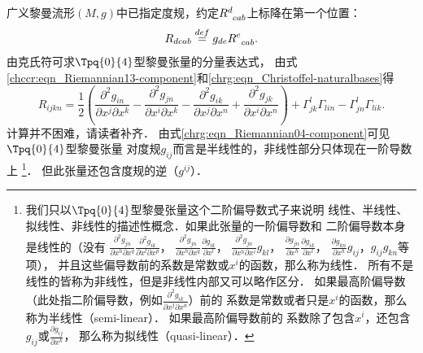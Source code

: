 广义黎曼流形$(M,g)$中已指定度规，约定$R_{\hphantom{a} cab}^d$上标降在第一个位置：
\begin{equation}\label{chrg:eqn_RiemannianCurvature-d4}
    R_{dcab} \overset{def}{=} g_{de}R_{\hphantom{a} cab}^e.
\end{equation}
由克氏符可求$\Tpq{0}{4}$型黎曼张量的分量表达式，
由式\eqref{chccr:eqn_Riemannian13-component}和\eqref{chrg:eqn_Christoffel-naturalbases}得
\begin{equation}\label{chrg:eqn_Riemannian04-component}
    R_{ijkn} =\frac{1}{2}\left(
           \frac{\partial^2 g_{in}} {\partial x^j\partial x^k}
         - \frac{\partial^2 g_{jn}} {\partial x^i\partial x^k}
         - \frac{\partial^2 g_{ik}} {\partial x^j\partial x^n}
         + \frac{\partial^2 g_{jk}} {\partial x^i\partial x^n} \right)
         + \Gamma_{jk}^l\Gamma _{lin} - \Gamma _{jn}^l\Gamma _{lik} .
\end{equation}  %
计算并不困难，请读者补齐．
由式\eqref{chrg:eqn_Riemannian04-component}可见$\Tpq{0}{4}$型黎曼张量
对度规$g_{ij}$而言是半线性的，非线性部分只体现在一阶导数上
{\footnote{我们只以$\Tpq{0}{4}$型黎曼张量这个二阶偏导数式子来说明
线性、半线性、拟线性、非线性的描述性概念．如果此张量的一阶偏导数和
二阶偏导数本身是线性的（没有
$\frac{\partial^2 g_{jn}} {\partial  x^h\partial  x^q}\frac{\partial^2 g_{ik}} {\partial  x^l\partial  x^p}$，
$\frac{\partial^2 g_{jn}} {\partial  x^h\partial  x^q}\frac{\partial g_{ik}} {\partial  x^l}$，
$\frac{\partial^2 g_{jn}} {\partial  x^h\partial  x^i}g_{kl}$，
$\frac{\partial g_{jn}} {\partial  x^h}\frac{\partial g_{ik}} {\partial  x^l}$，
$\frac{\partial g_{kn}} {\partial  x^h}g_{ij}$，$g_{ij}g_{kn}$等项），
并且这些偏导数前的系数是常数或$x^i$的函数，那么称为线性．
所有不是线性的皆称为非线性，但是非线性内部又可以略作区分．
如果最高阶偏导数（此处指二阶偏导数，例如$\frac{\partial^2 g_{ik}}{\partial x^j\partial x^n} $）前的
系数是常数或者只是$x^i$的函数，那么称为半线性（semi-linear）．
如果最高阶偏导数前的
系数除了包含$x^i$，还包含$g_{ij}$或$\frac{\partial g_{ij}} {\partial  x^k}$，
那么称为拟线性（quasi-linear）．}}．
但此张量还包含度规的逆（$g^{ij}$）．



